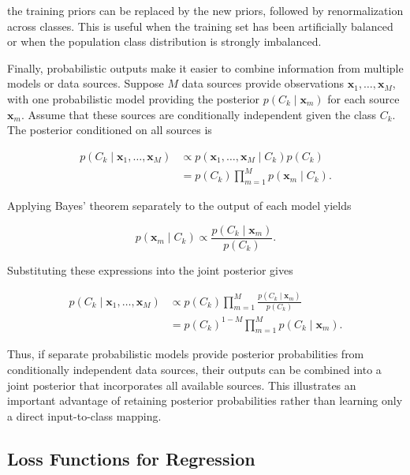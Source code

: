 \documentclass[10pt,twocolumn]{memoir}
\begin{document}
the training priors can be replaced by the new priors, followed by renormalization across classes. This is useful when the training set has been artificially balanced or when the population class distribution is strongly imbalanced.

Finally, probabilistic outputs make it easier to combine information from multiple models or data sources. Suppose $M$ data sources provide observations $\mathbf{x}_1,\ldots,\mathbf{x}_M$, with one probabilistic model providing the posterior $p(C_k\mid\mathbf{x}_m)$ for each source $\mathbf{x}_m$. Assume that these sources are conditionally independent given the class $C_k$. The posterior conditioned on all sources is

\begin{equation}
\begin{aligned}
    p(C_k\mid\mathbf{x}_1,\ldots,\mathbf{x}_M)
    &\propto
    p(\mathbf{x}_1,\ldots,\mathbf{x}_M\mid C_k)p(C_k) \\
    &=
    p(C_k)\prod_{m=1}^{M}p(\mathbf{x}_m\mid C_k).
\end{aligned}
\end{equation}

Applying Bayes' theorem separately to the output of each model yields

\begin{equation}
    p(\mathbf{x}_m\mid C_k)
    \propto
    \frac{p(C_k\mid\mathbf{x}_m)}{p(C_k)}.
\end{equation}

Substituting these expressions into the joint posterior gives

\begin{equation}
\begin{aligned}
    p(C_k\mid\mathbf{x}_1,\ldots,\mathbf{x}_M)
    &\propto
    p(C_k)
    \prod_{m=1}^{M}
    \frac{p(C_k\mid\mathbf{x}_m)}{p(C_k)} \\
    &=
    p(C_k)^{1-M}
    \prod_{m=1}^{M}p(C_k\mid\mathbf{x}_m).
\end{aligned}
\end{equation}

Thus, if separate probabilistic models provide posterior probabilities from conditionally independent data sources, their outputs can be combined into a joint posterior that incorporates all available sources. This illustrates an important advantage of retaining posterior probabilities rather than learning only a direct input-to-class mapping.

\subsection{Loss Functions for Regression}
\end{document}
